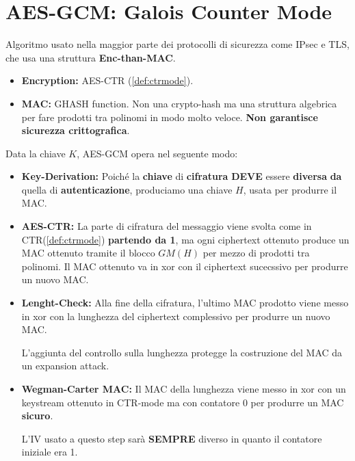 \section{AES-GCM: Galois Counter Mode}
\vspace{-5mm}
Algoritmo usato nella maggior parte dei protocolli di sicurezza come IPsec e TLS, che usa una struttura \textbf{Enc-than-MAC}. 
\begin{itemize}
    \item \textbf{Encryption:} AES-CTR (\cref{def:ctrmode}).
    \item \textbf{MAC:} GHASH function. Non una crypto-hash ma una struttura algebrica  per fare prodotti tra polinomi in modo molto veloce. \textbf{Non garantisce sicurezza crittografica}.
\end{itemize}
\begin{definition}\label{def:aesgcm}
Data la chiave $K$, AES-GCM opera nel seguente modo:
\begin{itemize}
    \item \textbf{Key-Derivation:} Poiché la \textbf{chiave} di \textbf{cifratura} \textbf{DEVE} essere \textbf{diversa} \textbf{da} quella di \textbf{autenticazione}, produciamo una chiave $H$, usata per produrre il MAC.
    \item \textbf{AES-CTR:} La parte di cifratura del messaggio viene svolta come in CTR\footnotemark(\cref{def:ctrmode}) \textbf{partendo da 1}, ma ogni ciphertext ottenuto produce un MAC ottenuto tramite il blocco $GM(H)$ per mezzo di prodotti tra polinomi. Il MAC ottenuto va in xor con il ciphertext sucecssivo per produrre un nuovo MAC.
    \item \textbf{Lenght-Check:} Alla fine della cifratura, l'ultimo MAC prodotto viene messo in xor con la lunghezza del ciphertext complessivo per produrre un nuovo MAC. 
    \begin{remark}
    L'aggiunta del controllo sulla lunghezza protegge la costruzione del MAC da un expansion attack.
    \end{remark}
    \item \textbf{Wegman-Carter MAC:} Il MAC della lunghezza viene messo in xor con un keystream ottenuto in CTR-mode ma con contatore $0$ per produrre un MAC \textbf{sicuro}. 
    \begin{remark}
    L'IV usato a questo step sarà \textbf{SEMPRE} diverso in quanto il contatore iniziale era 1. 
    \end{remark}
\end{itemize}
\end{definition}
